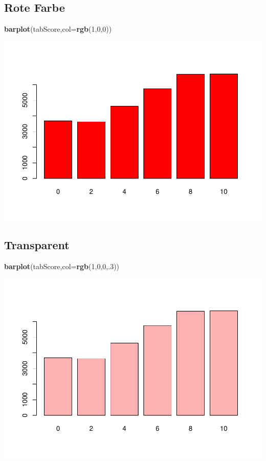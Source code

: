 \documentclass[]{article}
\newenvironment{Shaded}{\begin{snugshade}}{\end{snugshade}}
\newcommand{\KeywordTok}[1]{\textcolor[rgb]{0.13,0.29,0.53}{\textbf{{#1}}}}
\newcommand{\DataTypeTok}[1]{\textcolor[rgb]{0.13,0.29,0.53}{{#1}}}
\newcommand{\DecValTok}[1]{\textcolor[rgb]{0.00,0.00,0.81}{{#1}}}
\newcommand{\NormalTok}[1]{{#1}}
\begin{document}
\subsection{Rote Farbe}\label{rote-farbe}

\begin{Shaded}
\begin{Highlighting}[]
\KeywordTok{barplot}\NormalTok{(tabScore,}\DataTypeTok{col=}\KeywordTok{rgb}\NormalTok{(}\DecValTok{1}\NormalTok{,}\DecValTok{0}\NormalTok{,}\DecValTok{0}\NormalTok{))}
\end{Highlighting}
\end{Shaded}

\includegraphics{Intro_Datenanalyse1_files/figure-latex/unnamed-chunk-149-1.pdf}

\subsection{Transparent}\label{transparent}

\begin{Shaded}
\begin{Highlighting}[]
\KeywordTok{barplot}\NormalTok{(tabScore,}\DataTypeTok{col=}\KeywordTok{rgb}\NormalTok{(}\DecValTok{1}\NormalTok{,}\DecValTok{0}\NormalTok{,}\DecValTok{0}\NormalTok{,.}\DecValTok{3}\NormalTok{))}
\end{Highlighting}
\end{Shaded}

\includegraphics{Intro_Datenanalyse1_files/figure-latex/unnamed-chunk-150-1.pdf}
\end{document}
